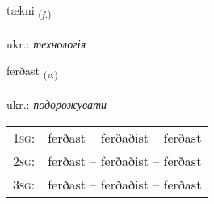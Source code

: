 \documentclass[frontgrid, backgrid]{flacards}\usepackage[]{graphicx}\usepackage[]{xcolor}
\begin{document}
\renewcommand{\flhead}{\vskip5pt \fboxsep=0pt {\small\bfseries\footnotesize Nafnorð | іменник}}
\renewcommand{\fcfoot}{\vskip5pt \fboxsep=0pt \hspace{2pt}{\small\bfseries\footnotesize 2K}}

\renewcommand{\blhead}{\vskip5pt {\small\bfseries\footnotesize Nafnorð | іменник }}
\renewcommand{\bcfoot}{\vskip5pt \hspace{2pt}{\small\bfseries\footnotesize 2K}}


{tækni \small{\textsubscript{(\textit{f.})}} \\[1ex] %
\textphonetic{[tʰaihknɪ]} \\
ukr.: \emph{технологія} \\  [2ex]
\renewcommand*{\arraystretch}{0.8}
}

\renewcommand{\flhead}{\vskip5pt \fboxsep=0pt {\small\bfseries\footnotesize Sagnorð | дієслово}}
\renewcommand{\fcfoot}{\vskip5pt \fboxsep=0pt \hspace{2pt}{\small\bfseries\footnotesize 2K}}

\renewcommand{\blhead}{\vskip5pt {\small\bfseries\footnotesize Sagnorð | дієслово }}
\renewcommand{\bcfoot}{\vskip5pt \hspace{2pt}{\small\bfseries\footnotesize 2K}}


{ferðast \small{\textsubscript{(\textit{v.})}} \\[1ex] %
\textphonetic{[fɛrðast]} \\
ukr.: \emph{подорожувати} \\  [2ex]
\renewcommand*{\arraystretch}{0.8}
\begin{tabular}{p{1cm}l}
\textsc{1sg}: & ferðast -- ferðaðist -- ferðast \\ 
\textsc{2sg}: & ferðast -- ferðaðist -- ferðast \\ 
\textsc{3sg}: & ferðast -- ferðaðist -- ferðast \\ 
\end{tabular}
}
\end{document}

